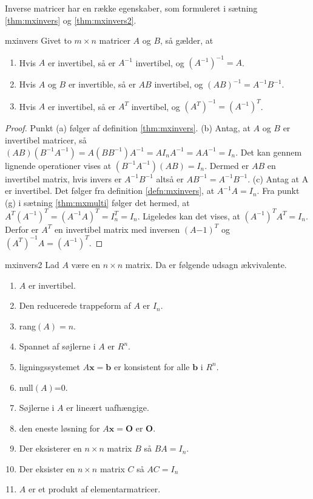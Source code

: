 Inverse matricer har en række egenskaber, som formuleret i sætning \ref{thm:mxinvers} og \ref{thm:mxinvers2}. 
%
\begin{thm}{}{mxinvers}
Givet to $m \times n$ matricer $A$ og $B$, så gælder, at
\begin{enumerate}[label=(\alph*)]
\item Hvis $A$ er invertibel, så er $A^{-1}$ invertibel, og $(A^{-1})^{-1}=A$.
\item Hvis $A$ og $B$ er invertible, så er $AB$ invertibel, og $(AB)^{-1}=A^{-1}B^{-1}$.
\item Hvis $A$ er invertibel, så er $A^T$ invertibel, og $(A^T)^{-1}=(A^{-1})^T$.
\end{enumerate}
\end{thm}
%
%
\begin{proof}
Punkt (a) følger af definition \ref{thm:mxinvers}. 
(b) Antag, at $A$ og $B$ er invertibel matricer, så $(AB)(B^{-1}A^{-1})=A(BB^{-1})A^{-1}=AI_nA^{-1}=AA^{-1}=I_n$. 
Det kan gennem lignende operationer vises at $(B^{-1}A^{-1})(AB)=I_n$.
Dermed er $AB$ en invertibel matrix, hvis invers er $A^{-1}B^{-1}$ altså er $AB^{-1}=A^{-1}B^{-1}$.
(c) Antag at A er invertibel. 
Det følger fra definition \ref{defn:mxinvers}, at $A^{-1}A=I_n$. 
Fra punkt (g) i sætning \ref{thm:mxmulti} følger det hermed, at $A^T(A^{-1})^T=(A^{-1}A)^T=I_n^T=I_n$. 
Ligeledes kan det vises, at $(A^{-1})^TA^T=I_n$. 
Derfor er $A^T$ en invertibel matrix med inversen $(A{-1})^T$ og $(A^T)^{-1}A=(A^{-1})^T$.
\end{proof}
%
%
\begin{thm}{}{mxinvers2}
Lad $A$ være en $n \times n$ matrix. 
Da er følgende udsagn ækvivalente.
\begin{enumerate}[label=(\alph*)]
\item $A$ er invertibel.
\item Den reducerede trappeform af $A$ er $I_n$.
\item rang$(A)=n$.
\item Spannet af søjlerne i $A$ er $R^n$.
\item ligningssystemet $A\textbf{x}=\textbf{b}$ er konsistent for alle $\textbf{b}$ i $R^n$.
\item null$(A)$=0.
\item Søjlerne i $A$ er lineært uafhængige.
\item den eneste løsning for $A\textbf{x}=\textbf{O}$ er $\textbf{O}$.
\item Der eksisterer en $n \times n$ matrix $B$ så $BA=I_n$.
\item Der eksister en $n \times n$ matrix $C$ så $AC=I_n$
\item $A$ er et produkt af elementarmatricer.
\end{enumerate}
\end{thm}
